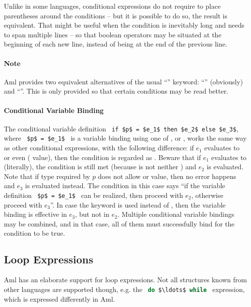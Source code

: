Unlike in some languages, conditional expressions do not require to place parentheses around the conditions -- but it is possible to do so, the result is equivalent. That might be useful when the condition is inevitably long and needs to span multiple lines -- so that boolean operators may be situated at the beginning of each new line, instead of being at the end of the previous line. 

\paragraph{Note}
Aml provides two equivalent alternatives of the usual ``'' keyword: ``'' (obviously) and ``''. This is only provided so that certain conditions may be read better.

\paragraph{Conditional Variable Binding}
The conditional variable definition ~\lstinline!if $p$ = $e_1$ then $e_2$ else $e_3$!, where ~\lstinline!$p$ = $e_1$!~ is a variable binding using one of ,  or , works the same way as other conditional expressions, with the following difference: if $e_1$ evaluates to  or even \code{()} ( value), then the condition is regarded as . Beware that if $e_1$ evaluates to  (literally), the condition is still met (because  is not  neither \code{()}) and $e_2$ is evaluated. Note that if type required by $p$ does not allow  or \code{()} value, then no error happens and $e_3$ is evaluated instead. The condition in this case says ``if the variable definition ~\lstinline!$p$ = $e_1$!~ can be realized, then proceed with $e_2$, otherwise proceed with $e_3$''. In case the  keyword is used instead of , then the variable binding is effective in $e_3$, but not in $e_2$. Multiple conditional variable bindings may be combined, and in that case, all of them must successfully bind for the condition to be true. 






\subsection{Loop Expressions}

Aml has an elaborate support for loop expressions. Not all structures known from other languages are supported though, e.g. the ~\lstinline[language=Java]!do $\ldots$ while!~ expression, which is expressed differently in Aml. 







